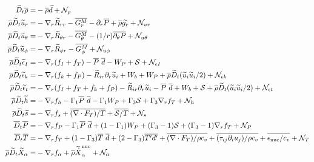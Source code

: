 \documentclass[10pt,paper=a4]{report}
\newcommand{\eht}{\overline}
\newcommand{\fht}{\widetilde}
\newcommand{\fav}{\widetilde}
\newcommand{\av}{\overline}
\def\erho{\eht{\rho}}
\begin{document}
\begin{table}[!h]
\label{tab:rans}
\begin{align}
\fav{D}_t \av{\rho} =& -\av{\rho} \fav{d} + {\mathcal N_\rho}  \label{eq:rans_density}\\
\av{\rho}\fav{D}_t\fav{u}_r = & -\nabla_r \fav{R}_{rr} -\av{G^{M}_r} - \partial_r \av{P} + \av{\rho}\fav{g_r} + {\mathcal N_{ur}} \\ 
\av{\rho}\fav{D}_t\fav{u}_\theta = & -\nabla_r \fav{R}_{\theta r} -\av{G^{M}_\theta} - (1/r)\av{\partial_\theta P} + {\mathcal N_{u \theta}}  \\
\av{\rho}\fav{D}_t\fav{u}_\phi = & -\nabla_r \fav{R}_{\phi r} -\av{G^{M}_\phi} + {\mathcal N_{u \phi}} \\
\av{\rho} \fav{D}_t \fav{\epsilon}_I = & -\nabla_r  ( f_I + f_T ) - \av{P} \ \av{d} - W_P  + {\mathcal S} + {\mathcal N_{\epsilon I}} \\
\av{\rho} \fav{D}_t \fav{\epsilon}_k = & -\nabla_r  ( f_k +  f_P ) - \fht{R}_{ir}\partial_r \fht{u}_i + W_b + W_P +\av{\rho}\fav{D}_t (\fav{u}_i \fav{u}_i / 2) + {\mathcal N_{\epsilon k}} \label{eq:rans_mke} \\
\av{\rho} \fav{D}_t \fav{\epsilon}_t = &  -\nabla_r ( f_I + f_T + f_k + f_P ) - \fht{R}_{ir}\partial_r \fht{u}_i - \av{P} \ \av{d} + W_b + {\mathcal S} + \av{\rho}\fav{D}_t (\fav{u}_i \fav{u}_i / 2) + {\mathcal N_{\epsilon t}}  \label{eq:rans_etot} \\
\erho\fav{D}_t \fav{h} = & -\nabla_r f_h - \Gamma_1\eht{P} \ \eht{d} - \Gamma_1 W_P + \Gamma_3 {\mathcal S} + \Gamma_3 \nabla_r f_T + {\mathcal N_h} \label{eq:rans_h} \\
\av{\rho} \fav{D}_t \fav{s} = &  -\nabla_r  f_s    + \av{(\nabla \cdot F_T)/T}+ \av{{\mathcal S}/T} + {\mathcal N_s}  \label{eq:rans_entropy} \\
\av{D}_t \av{P} = &  -\nabla_r f_P - \Gamma_1 \eht{P} \ \eht{d} + (1 -\Gamma_1) W_P + (\Gamma_3 -1){\mathcal S} + (\Gamma_3 - 1)\nabla_r f_T + {\mathcal N_P} \\
\av{D}_t \av{T} = & -\nabla_r f_T + (1-\Gamma_3)\eht{T}\ \eht{d} + (2-\Gamma_3)\eht{T'd'} + \eht{(\nabla \cdot F_T) / \rho c_v} + \eht{(\tau_{ij}\partial_i u_j)/\rho c_v} + \eht{\epsilon_{\rm nuc} / c_v} + {\mathcal N_T} \\
\erho\fav{D}_t \fav{X}_\alpha = & -\nabla_r f_\alpha + \av{\rho}\fav{\dot{X}}_\alpha^{\rm nuc} + {\mathcal N_\alpha} \label{eq:rans_comp} \\

\end{align}
\end{table}
\end{document}
